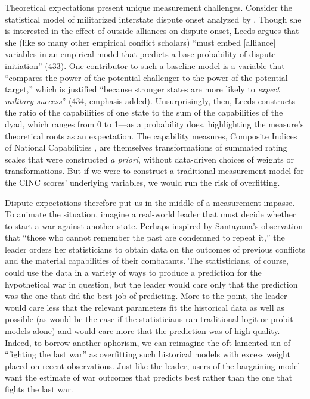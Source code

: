 Theoretical expectations present unique measurement challenges. 
Consider the statistical model of militarized interstate dispute onset analyzed by \citet{leeds2003}. 
Though she is interested in the effect of outside alliances on dispute onset, Leeds argues that she (like so many other empirical conflict scholars) ``must embed [alliance] variables in an empirical model that predicts a base probability of dispute initiation'' (433). 
One contributor to such a baseline model is a variable that ``compares the power of the potential challenger to the power of the potential target,'' which is justified ``because stronger states are more likely to \emph{expect military success}'' (434, emphasis added). 
Unsurprisingly, then, Leeds constructs the ratio of the capabilities of one state to the sum of the capabilities of the dyad, which ranges from 0 to 1---as a probability does, highlighting the measure's theoretical roots as an expectation. 
The capability measures, Composite Indices of National Capabilities \citep{singer1972}, are themselves transformations of summated rating scales that were constructed \textit{a priori}, without data-driven choices of weights or transformations. 
But if we were to construct a traditional measurement model for the CINC scores' underlying variables, we would run the risk of overfitting.

Dispute expectations therefore put us in the middle of a measurement impasse.
To animate the situation, imagine a real-world leader that must decide whether to start a war against another state.
Perhaps inspired by Santayana's observation that ``those who cannot remember the past are condemned to repeat it,'' the leader orders her statisticians to obtain data on the outcomes of previous conflicts and the material capabilities of their combatants.
The statisticians, of course, could use the data in a variety of ways to produce a prediction for the hypothetical war in question, but the leader would care only that the prediction was the one that did the best job of predicting.
More to the point, the leader would care less that the relevant parameters fit the historical data as well as possible (as would be the case if the statisticians ran traditional logit or probit models alone) and would care more that the prediction was of high quality.
Indeed, to borrow another aphorism, we can reimagine the oft-lamented sin of ``fighting the last war'' \citep[e.g.][]{hart1972} as overfitting such historical models with excess weight placed on recent observations.
Just like the leader, users of the bargaining model want the estimate of war outcomes that predicts best rather than the one that fights the last war.

